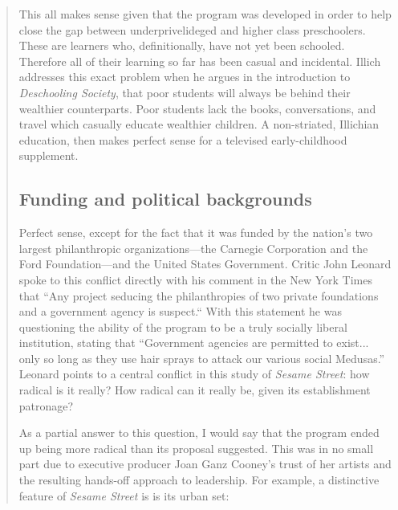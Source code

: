 \documentclass[12pt,letterpaper]{article}
\newcommand{\ses}{\textit{Sesame Street }}
\begin{document}
\begin{quote}
	This all makes sense given that the program was developed in order to 
	help close the gap between underprivelideged and higher class 
	preschoolers\autocite[sec. 1]{Cooney}. These are learners who, 
	definitionally, have not yet been schooled. Therefore all of their 
	learning so far has been casual and incidental. Illich addresses this 
	exact problem when he argues in the introduction to \textit{Deschooling
	Society}, that poor students will always be behind their wealthier
	counterparts\autocite[5]{Illich}. Poor students lack the books, 
	conversations, and travel which casually educate wealthier children.
	A non-striated, Illichian education, then makes perfect sense for
	a televised early-childhood supplement.

	\subsection*{Funding and political backgrounds}

	Perfect sense, except for the fact that it was funded by the nation’s 
	two largest philanthropic organizations—the Carnegie Corporation and 
	the Ford Foundation—and the United States Government. Critic John 
	Leonard spoke to this conflict directly with his comment in the New 
	York Times that ``Any project seducing the philanthropies of two private
	foundations and a government agency is suspect.``
	With this statement he was questioning the ability of the program to be 	
	a truly socially liberal institution, stating that ``Government agencies
	are permitted to exist... only so long as they use hair sprays to 
	attack our various social Medusas.'' \autocite[146]{Davis} Leonard 
	points to a central conflict in this study of \textit{Sesame Street}: 
	how radical is it really? How radical can it really be, given its 
	establishment patronage?

	As a partial answer to this question, I would say that the program ended
	up being more radical than its proposal suggested. This was in no small 
	part due to executive producer Joan Ganz Cooney’s trust of her artists and 
	the resulting hands-off approach to leadership.\autocite[155]{Davis} For
	example, a distinctive feature of \ses is is its urban set:


\end{quote}
\end{document}
